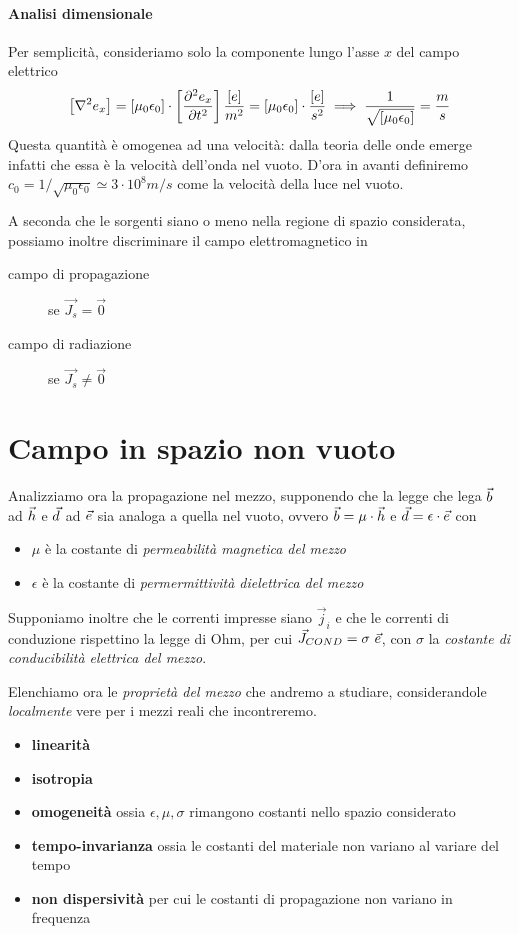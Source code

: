 \paragraph{Analisi dimensionale}

Per semplicità, consideriamo solo la componente lungo l'asse $x$ del campo elettrico
\begin{equation}
	\left[\nabla^2 e_x\right] = \left[\mu_0\epsilon_0\right]	\cdot \left[\deriv[2]{e_x}{t}\right] \\
	\frac{[e]}{m^2} = [\mu_0\epsilon_0] \cdot \frac{[e]}{s^2} \implies \frac{1}{\sqrt{[\mu_0\epsilon_0]}} = \frac{m}{s}
\end{equation}
Questa quantità è omogenea ad una velocità: dalla teoria delle onde emerge infatti che essa è la velocità dell'onda nel vuoto. D'ora in avanti definiremo
$c_0 = 1 / \sqrt{\mu_0\epsilon_0} \simeq 3 \cdot 10^8 m/s$ come la velocità della luce nel vuoto.

A seconda che le sorgenti siano o meno nella regione di spazio considerata, possiamo inoltre discriminare il campo elettromagnetico in

\begin{description}
	\item [campo di propagazione] se $\vec{J_s}=\vec{0}$
	\item [campo di radiazione] se $\vec{J_s}\neq\vec{0}$
\end{description}

\section{Campo in spazio non vuoto}
Analizziamo ora la propagazione nel mezzo, supponendo che la legge che lega $\b$ ad $\h$ e $\d$ ad $\e$ sia analoga a quella nel vuoto, ovvero $\b=\mu\cdot\h$ e $\d=\epsilon\cdot\e$ con
\begin{itemize}
	\item $\mu$ è la costante di \emph{permeabilità	 magnetica del mezzo}
	\item $\epsilon$ è la costante di \emph{permermittività	 dielettrica del mezzo}
\end{itemize}
Supponiamo inoltre che le correnti impresse siano $\vec{j}_i$ e che le correnti di conduzione rispettino la legge di Ohm, per cui $\vec{J}_{COND} = \sigma ~ \e$, con $\sigma$ la \emph{costante di conducibilità elettrica del mezzo}.

Elenchiamo ora le \emph{proprietà del mezzo} che andremo a studiare, considerandole \emph{localmente} vere per i mezzi reali che incontreremo.
\begin{itemize}
	\item \textbf{linearità}
	\item \textbf{isotropia}
	\item \textbf{omogeneità} ossia $\epsilon, \mu, \sigma$ rimangono costanti nello spazio considerato
	\item \textbf{tempo-invarianza} ossia le costanti del materiale non variano al variare del tempo
	\item \textbf{non dispersività} per cui le costanti di propagazione non variano in frequenza
\end{itemize}

